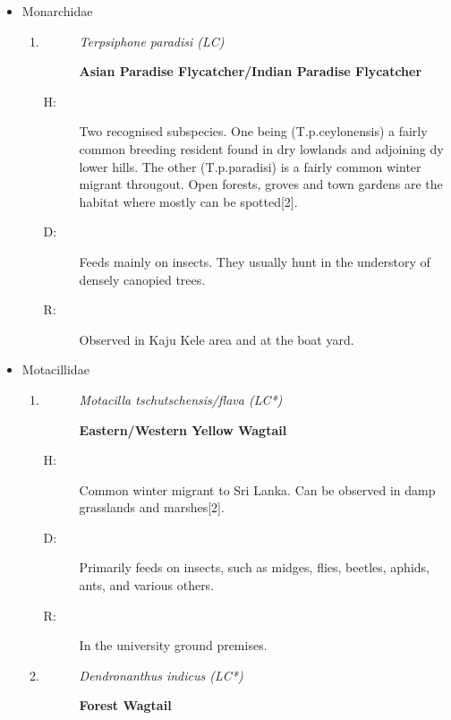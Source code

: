 \begin{itemize}
\begin{enumerate}
\begin{description}
\end{description}%
\end{enumerate}%
\item%
Monarchidae%
\begin{enumerate}%
\item%
\begin{description}%
\item[]%
\textit{Terpsiphone paradisi (LC)}%
\item[]%
\textbf{Asian Paradise Flycatcher/Indian Paradise Flycatcher}%
\end{description}%
\begin{description}%
\item[H: ]%
Two recognised subspecies. One being (T.p.ceylonensis) a fairly common breeding resident found in dry lowlands and adjoining dy lower hills. The other (T.p.paradisi) is a fairly common winter migrant througout. Open forests, groves and town gardens are the habitat where mostly can be spotted{[}2{]}.%
\item[D: ]%
Feeds mainly on insects.  They usually hunt in the understory of densely canopied trees.%
\item[R: ]%
Observed in Kaju Kele area and at the boat yard.%
\end{description}%
\end{enumerate}%
\item%
Motacillidae%
\begin{enumerate}%
\item%
\begin{description}%
\item[]%
\textit{Motacilla tschutschensis/flava (LC*)}%
\item[]%
\textbf{Eastern/Western Yellow Wagtail}%
\end{description}%
\begin{description}%
\item[H: ]%
Common winter migrant to Sri Lanka. Can be observed in damp grasslands and marshes{[}2{]}.%
\item[D: ]%
Primarily feeds on insects, such as midges, flies, beetles, aphids, ants, and various others.%
\item[R: ]%
In the university ground premises.%
\end{description}%
\item%
\begin{description}%
\item[]%
\textit{Dendronanthus indicus (LC*)}%
\item[]%
\textbf{Forest Wagtail}%

\end{description}
\end{enumerate}
\end{itemize}
